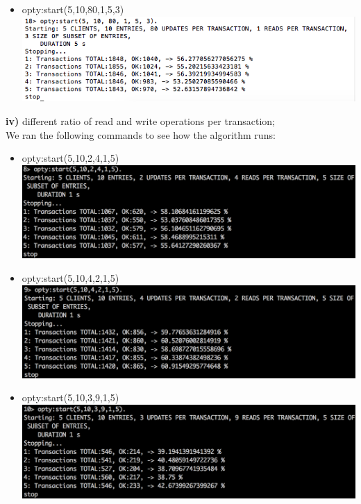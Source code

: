 \documentclass[a4paper, 11pt]{article}
\begin{document}
\begin{itemize}
\item opty:start(5,10,80,1,5,3)\\
\includegraphics[scale=0.5]{images/exp-iii-6.png} \\
\end{itemize}
%
\textbf{iv)} different ratio of read and write operations per transaction;\\
We ran the following commands to see how the algorithm runs:\\
\begin{itemize}
\item opty:start(5,10,2,4,1,5)\\
\includegraphics[scale=0.5]{images/exp-iv-1.png} \\
\item opty:start(5,10,4,2,1,5)\\
\includegraphics[scale=0.5]{images/exp-iv-2.png} \\
\item opty:start(5,10,3,9,1,5)\\
\includegraphics[scale=0.5]{images/exp-iv-3.png} \\

\end{itemize}
\end{document}
